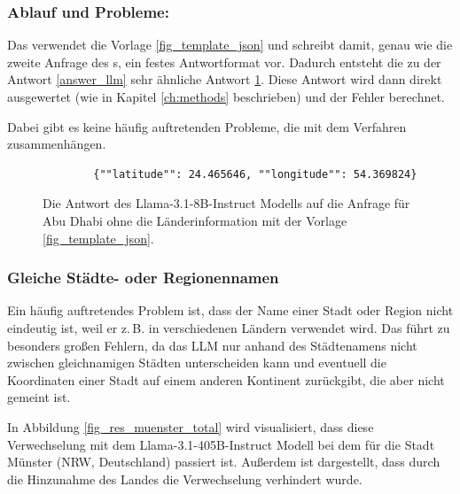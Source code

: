 \subsubsection*{Ablauf und Probleme: \jsonv{}}
Das \jsonv{} verwendet die Vorlage \ref{fig_template_json} und schreibt damit, genau wie die zweite Anfrage des \llmv{}s, ein festes Antwortformat vor.
Dadurch entsteht die zu der Antwort \ref{answer_llm} sehr ähnliche Antwort \ref{answer_json}.
Diese Antwort wird dann direkt ausgewertet (wie in Kapitel \ref{ch:methods} beschrieben) und der Fehler berechnet.

Dabei gibt es keine häufig auftretenden Probleme, die mit dem Verfahren zusammenhängen.

\begin{figure} %

    \begin{lstlisting}
        {""latitude"": 24.465646, ""longitude"": 54.369824}
    \end{lstlisting}

    \caption{Die Antwort des Llama-3.1-8B-Instruct Modells auf die Anfrage für Abu Dhabi ohne die Länderinformation mit der Vorlage \ref{fig_template_json}.}

    \label{answer_json}
\end{figure}

\subsubsection*{Gleiche Städte- oder Regionennamen}
Ein häufig auftretendes Problem ist, dass der Name einer Stadt oder Region nicht eindeutig ist, weil er z.\,B. in verschiedenen Ländern verwendet wird.
Das führt zu besonders großen Fehlern, da das LLM nur anhand des Städtenamens nicht zwischen gleichnamigen Städten unterscheiden kann und eventuell die Koordinaten einer Stadt auf einem anderen Kontinent zurückgibt, die aber nicht gemeint ist.

In Abbildung \ref{fig_res_muenster_total} wird visualisiert, dass diese Verwechselung mit dem Llama-3.1-405B-Instruct Modell bei dem \jsonv{} für die Stadt Münster (NRW, Deutschland) passiert ist.
Außerdem ist dargestellt, dass durch die Hinzunahme des Landes die Verwechselung verhindert wurde.

